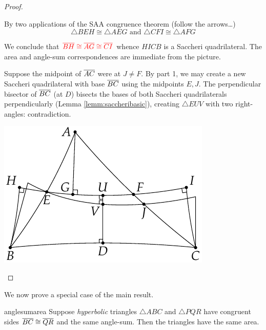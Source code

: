 \begin{proof}
\begin{enumerate}
  \item By two applications of the SAA congruence theorem (follow the arrows\ldots)\vspace{-3pt}
  \[\triangle BEH\cong\triangle AEG\text{ \ and \ }\triangle CFI\cong\triangle AFG\]
  \begin{minipage}[t]{0.57\linewidth}\vspace{-11pt}
  We conclude that $\textcolor{red}{\overline{BH}\cong\overline{AG}\cong\overline{CI}}$ whence $HICB$ is a Saccheri quadrilateral. The area and angle-sum correspondences are immediate from the picture.
  \item Suppose the midpoint of $\overline{AC}$ were at $J\neq F$. By part 1, we may create a new Saccheri quadrilateral with base $\overline{BC}$ using the midpoints $E,J$.\smallbreak
  The perpendicular bisector of $\overline{BC}$ (at $D$) bisects the bases of both Saccheri quadrilaterals perpendicularly (Lemma \ref{lemm:saccheribasic}), creating $\triangle EUV$ with two right-angles: contradiction.
	\end{minipage}\begin{minipage}[t]{0.43\linewidth}\vspace{-20pt}
	\flushright\includegraphics{area-saccheri5}\qedhere
	\end{minipage}%
\end{enumerate}
\end{proof}

We now prove a special case of the main result.

\begin{lemm}{}{anglesumarea}
Suppose \emph{hyperbolic} triangles $\triangle ABC$ and $\triangle PQR$ have congruent sides $\overline{BC}\cong\overline{QR}$ and the same angle-sum. Then the triangles have the same area.
\end{lemm}


